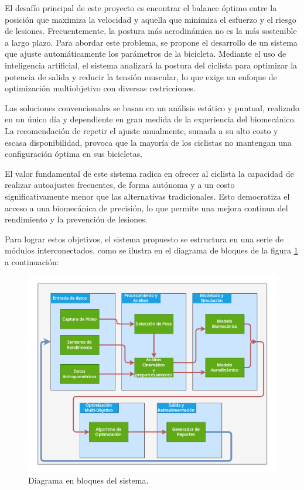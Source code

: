 \documentclass[
11pt, %
]{charter}
\begin{document}
El desafío principal de este proyecto es encontrar el balance óptimo entre la posición que maximiza la velocidad y aquella que minimiza el esfuerzo y el riesgo de lesiones. Frecuentemente, la postura más aerodinámica no es la más sostenible a largo plazo. Para abordar este problema, se propone el desarrollo de un sistema que ajuste automáticamente los parámetros de la bicicleta. Mediante el uso de inteligencia artificial, el sistema analizará la postura del ciclista para optimizar la potencia de salida y reducir la tensión muscular, lo que exige un enfoque de optimización multiobjetivo con diversas restricciones.

Las soluciones convencionales se basan en un análisis estático y puntual, realizado en un único día y dependiente en gran medida de la experiencia del biomecánico. La recomendación de repetir el ajuste anualmente, sumada a su alto costo y escasa disponibilidad, provoca que la mayoría de los ciclistas no mantengan una configuración óptima en sus bicicletas.

El valor fundamental de este sistema radica en ofrecer al ciclista la capacidad de realizar autoajustes frecuentes, de forma autónoma y a un costo significativamente menor que las alternativas tradicionales. Esto democratiza el acceso a una biomecánica de precisión, lo que permite una mejora continua del rendimiento y la prevención de lesiones.

Para lograr estos objetivos, el sistema propuesto se estructura en una serie de módulos interconectados, como se ilustra en el diagrama de bloques de la figura \ref{fig:diagBloques} a continuación:

\begin{figure}[htpb]
\centering
\includegraphics[width=.65\textwidth]{./Figuras/Diagrama_de_Bloques_proyecto_ciclista.pdf}
\caption{Diagrama en bloques del sistema.}
\label{fig:diagBloques}
\end{figure}
\end{document}
